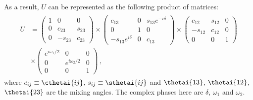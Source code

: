 As a result, $U$ can be represented as the following product of matrices:
\begin{align}
\begin{split}
  U &=
  \begin{pmatrix}
    1 & 0       & 0 \\
    0 & c_{23}  & s_{23} \\
    0 & -s_{23} & c_{23}  
  \end{pmatrix}
  \times
  \begin{pmatrix}
    c_{13}             & 0 & s_{13}e^{-i\delta} \\
    0                  & 1 & 0 \\
    -s_{13}e^{i\delta} & 0 & c_{13}
  \end{pmatrix}
  \times
  \begin{pmatrix}
    c_{12}  & s_{12} & 0 \\
    -s_{12} & c_{12} & 0 \\
    0       & 0      & 1
  \end{pmatrix}
  \\
  &\times
  \begin{pmatrix}
    e^{i\omega_{1}/2} & 0                 & 0 \\
    0                 & e^{i\omega_{2}/2} & 0 \\
    0                 & 0                 & 1
  \end{pmatrix} \, ,
\end{split}
\end{align}
where $c_{ij} \equiv \cthetai{ij}$, $s_{ij} \equiv \sthetai{ij}$ and $\thetai{13}$, $\thetai{12}$, $\thetai{23}$ are the mixing angles.
The complex phases here are $\delta$, $\omega_{1}$ and $\omega_{2}$.

